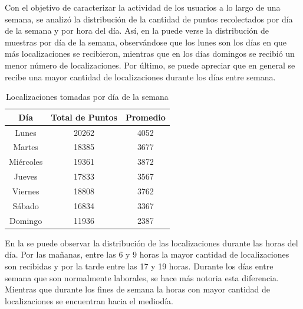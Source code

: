 Con el objetivo de caracterizar la actividad de los usuarios a lo largo de una semana, se analizó la distribución de la cantidad de puntos recolectados por día de la semana y por hora del día. Así, en la   puede verse la distribución de muestras por día de la semana, observándose que los lunes son los días en que más localizaciones se recibieron, mientras que en los días domingos se recibió un menor número de localizaciones. Por último, se puede apreciar que en general se recibe una mayor cantidad de localizaciones durante los días entre semana.

\begin{table}[h]
	\centering
	\begin{tabular}{ccc}
        \toprule
    	Día  & Total de Puntos & Promedio\\
    	\midrule
    	Lunes & 20262 & 4052 \\
    	Martes & 18385 & 3677 \\
    	Miércoles & 19361  & 3872 \\ 
    	Jueves & 17833 & 3567 \\
    	Viernes & 18808 & 3762 \\
    	Sábado & 16834 & 3367 \\
    	Domingo & 11936 & 2387 \\
    	\bottomrule
	\end{tabular}
	\caption{Localizaciones tomadas por día de la semana} 
	\label{table:localizaciones_por_dia}
\end{table}

En la  se puede observar la distribución de las localizaciones durante las horas del día. Por las mañanas, entre las 6 y 9 horas la mayor cantidad de localizaciones son recibidas y por la tarde entre las 17 y 19 horas. Durante los días entre semana que son normalmente laborales, se hace más notoria esta diferencia. Mientras que durante los fines de semana la horas con mayor cantidad de localizaciones se encuentran hacia el mediodía.

